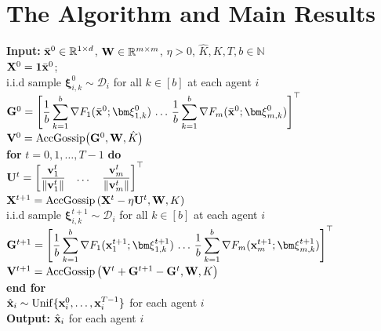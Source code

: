 \documentclass[sigconf]{acmart}
\newcommand{\Norm}[1]{\left\| #1 \right\|}
\def\vone{{\bf{1}}}
\def\vv{{\bf{v}}}
\def\vx{{\bf{x}}}
\def\fD{{\mathcal{D}}}
\def\BN{{\mathbb{N}}}
\def\BR{{\mathbb{R}}}
\def\mG {{\bf G}}
\def\mU {{\bf U}}
\def\mV {{\bf V}}
\def\mW {{\bf W}}
\def\mX {{\bf X}}
\theoremstyle{plain}
\def\bx{{\bar\vx}}
\def\vxi{{\bm\xi}}
\def\AG{{\rm AccGossip}}
\begin{document}
\section{The Algorithm and Main Results}


\begin{algorithm}[t]
	\caption{DNSGD} \label{alg:DNSGD}
	\begin{algorithmic}[1]
		\STATE \textbf{Input:} $\bx^0\in\BR^{1\times d}$, $\mW\in\BR^{m\times m}$, $\eta>0$, $\hat K,K,T,b\in\BN$ \\[0.15cm]
        \STATE $\mX^0=\vone\bx^0$;\\
        \STATE i.i.d sample $\vxi_{i,k}^0\sim\fD_i$ for all $k\in[b]$ at each agent $i$  \\[0.12cm]
        \STATE \label{line:G0} $\mG^0 = \begin{bmatrix}
              \displaystyle{\frac{1}{b}\sum_{k=1}^{b} \nabla F_1(\bx^0;\vxi_{1,k}^0)} 
              &\!\!\!\!\dots\!\!\!\! & 
              \displaystyle{\frac{1}{b}\sum_{k=1}^{b} \nabla F_m(\bx^0;\vxi_{m,k}^0)}
            \end{bmatrix}^\top$ \\[0.15cm]
        \STATE\label{line:V0} $\mV^0 = \AG\big(\mG^0, \mW, \hat K\big)$ \\[0.15cm]        
        \STATE \textbf{for} $t = 0, 1, \dots, {T-1}$ \textbf{do} \\[0.12cm]   		     
        \STATE\quad\label{line:U} $\mU^t = \begin{bmatrix}
            \dfrac{\vv^t_1}{\Norm{\vv^t_1}} & \dots & \dfrac{\vv^t_m}{\Norm{\vv^t_m}}
        \end{bmatrix}^\top$ \label{line:update-V} \\[0.15cm]
        \STATE\quad $\mX^{t+1} = \AG\left(\mX^{t} - \eta\mU^t, \mW, K\right)$ \label{line:update-X} \\[0.15cm]
        \STATE\quad i.i.d sample $\vxi_{i,k}^{t+1}\sim\fD_i$ for all $k\in[b]$ at each agent $i$
        \STATE\quad \label{line:Gt} $\mG^{t+1} = \begin{bmatrix}
              \displaystyle{\frac{1}{b}\sum_{k=1}^b \nabla F_1(\vx_1^{t+1};\vxi_{1,k}^{t+1})} &\!\!\!\!\dots\!\!\!\! & 
              \displaystyle{\frac{1}{b}\sum_{k=1}^b \nabla F_m(\vx_m^{t+1};\vxi_{m,k}^{t+1})}
            \end{bmatrix}^\top$ \\[0.15cm]
        \STATE\quad \label{line:Vt1} $\mV^{t+1} = \AG\left(\mV^{t} + \mG^{t+1} - \mG^{t}, \mW, K\right)$ \\[0.15cm]       
        \STATE\textbf{end for} \\[0.15cm]
        \STATE $\hat\vx_i\sim{\rm Unif}\{\vx_i^0,\dots,\vx_i^{T-1}\}$ for each agent $i$\\[0.15cm] 
		\STATE \textbf{Output:} $\hat\vx_i$ for each agent $i$
    \end{algorithmic}
\end{algorithm}
\end{document}
